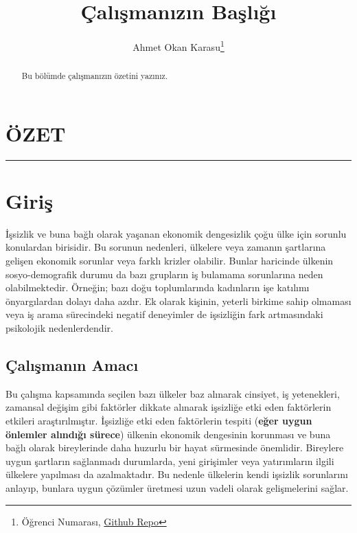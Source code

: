 \documentclass[
]{article}
\title{Çalışmanızın Başlığı}
\author{Ahmet Okan Karasu\footnote{Öğrenci Numarası,
  \href{https://github.com/ahmetokankarasu/finalodevi}{Github Repo}}}
\date{}
\begin{document}
\maketitle
\begin{abstract}
Bu bölümde çalışmanızın özetini yazınız.
\end{abstract}

\newpage{}

\hypertarget{uxf6zet}{%
\section{ÖZET}\label{uxf6zet}}

\begin{center}\rule{0.5\linewidth}{0.5pt}\end{center}

\hypertarget{giriux15f}{%
\section{Giriş}\label{giriux15f}}

İşsizlik ve buna bağlı olarak yaşanan ekonomik dengesizlik çoğu ülke
için sorunlu konulardan birisidir. Bu sorunun nedenleri, ülkelere veya
zamanın şartlarına gelişen ekonomik sorunlar veya farklı krizler
olabilir. Bunlar haricinde ülkenin sosyo-demografik durumu da bazı
grupların iş bulamama sorunlarına neden olabilmektedir. Örneğin; bazı
doğu toplumlarında kadınların işe katılımı önyargılardan dolayı daha
azdır. Ek olarak kişinin, yeterli birkime sahip olmaması veya iş arama
sürecindeki negatif deneyimler de işsizliğin fark artmasındaki
psikolojik nedenlerdendir.

\hypertarget{uxe7alux131ux15fmanux131n-amacux131}{%
\subsection{Çalışmanın
Amacı}\label{uxe7alux131ux15fmanux131n-amacux131}}

Bu çalışma kapsamında seçilen bazı ülkeler baz alınarak cinsiyet, iş
yetenekleri, zamansal değişim gibi faktörler dikkate alınarak işsizliğe
etki eden faktörlerin etkileri araştırılmıştır. İşsizliğe etki eden
faktörlerin tespiti (\textbf{eğer uygun önlemler alındığı sürece})
ülkenin ekonomik dengesinin korunması ve buna bağlı olarak bireylerinde
daha huzurlu bir hayat sürmesinde önemlidir. Bireylere uygun şartların
sağlanmadı durumlarda, yeni girişimler veya yatırımların ilgili ülkelere
yapılması da azalmaktadır. Bu nedenle ülkelerin kendi işsizlik
sorunlarını anlayıp, bunlara uygun çözümler üretmesi uzun vadeli olarak
gelişmelerini sağlar.
\end{document}
